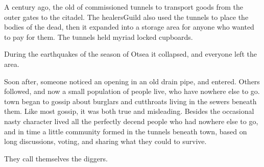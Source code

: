 

\begin{exampletext}
  A century ago, the old  of  commissioned tunnels to transport goods from the outer gates to the citadel.
  The \gls{healersGuild} also used the tunnels to place the bodies of the dead, then it expanded into a storage area for anyone who wanted to pay for them.
  The tunnels held myriad locked cupboards.


  During the earthquakes of the season of Otsea%
  it collapsed, and everyone left the area.


  Soon after, someone noticed an opening in an old drain pipe, and entered.
  Others followed, and now a small population of people live, who have nowhere else to go.
  \Gls{town} began to gossip about burglars and cutthroats living in the sewers beneath them.
  Like most gossip, it was both true and misleading.
  Besides the occasional nasty character lived all the perfectly decend people who had nowhere else to go, and in time a little community formed in the tunnels beneath \gls{town}, based on long discussions, voting, and sharing what they could to survive.

  They call themselves the \glspl{digger}.
\end{exampletext}

